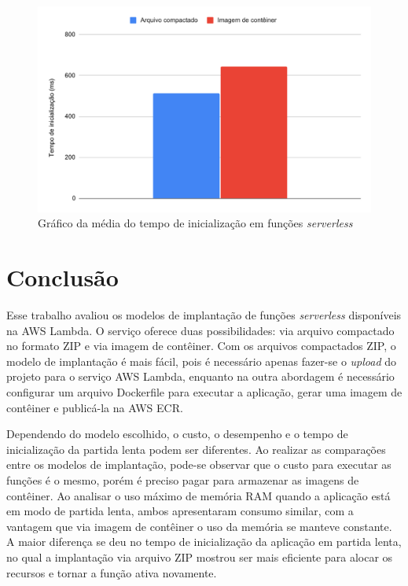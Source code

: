 \documentclass[conference]{IEEEtran}
\begin{document}
\begin{figure}[H]
    \centering 
    \includegraphics [width=\linewidth]{images/init-time-average-PT.pdf}
    \par
    \caption{Gráfico da média do tempo de inicialização em funções \textit{serverless}}
    \label{graph:functions_init_time_average}
\end{figure}

\section{Conclusão}
\label{sec:Conclusion}

Esse trabalho avaliou os modelos de implantação de funções \textit{serverless} disponíveis na AWS Lambda. O serviço oferece duas possibilidades: via arquivo compactado no formato ZIP e via imagem de contêiner. Com os arquivos compactados ZIP, o modelo de implantação é mais fácil, pois é necessário apenas fazer-se o \textit{upload} do projeto para o serviço AWS Lambda, enquanto na outra abordagem é necessário configurar um arquivo Dockerfile para executar a aplicação, gerar uma imagem de contêiner e publicá-la na AWS ECR.

Dependendo do modelo escolhido, o custo, o desempenho e o tempo de inicialização da partida lenta podem ser diferentes.
Ao realizar as comparações entre os modelos de implantação, pode-se observar que o custo para executar as funções é o mesmo, porém é preciso pagar para armazenar as imagens de contêiner. Ao analisar o uso máximo de memória RAM quando a aplicação está em modo de partida lenta, ambos apresentaram consumo similar, com a vantagem que via imagem de contêiner o uso da memória se manteve constante. A maior diferença se deu no tempo de inicialização da aplicação em partida lenta, no qual a implantação via arquivo ZIP mostrou ser mais eficiente para alocar os recursos e tornar a função ativa novamente.
\end{document}

